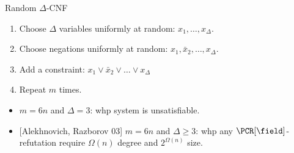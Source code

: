 \begin{frame}{Random $\Delta$-CNF}

    \begin{minipage}{0.3\linewidth}
        \centering
    \end{minipage}
    \begin{minipage}{0.68\linewidth}
        \begin{enumerate}
            \item Choose $\Delta$ variables uniformly at random: $x_1, \dots, x_{\Delta}$.
            \pause
            \pause
            \item Choose negations uniformly at random: $x_1, \bar{x}_2, \dots, x_{\Delta}$.
            \item Add a constraint: $x_1 \lor \bar{x}_2 \lor \dots \lor x_{\Delta}$
            \item Repeat $m$ times.
        \end{enumerate}
    \end{minipage}

    \pause
    \vspace{0.5cm}
    \begin{itemize}
        \item $m = 6n$ and $\Delta = 3$: whp system is unsatisfiable.
        \item {[Alekhnovich, Razborov 03]} $m = 6n$ and $\Delta \ge 3$: whp any $\PCR[\field]$-refutation
            require $\Omega\left(n\right)$ degree and $2^{\Omega(n)}$ size.
    \end{itemize}
\end{frame}


